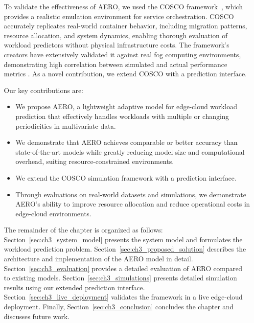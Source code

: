 To validate the effectiveness of \ac{AERO}, we used the \ac{COSCO} framework~\cite{tuli2021cosco}, which provides a realistic emulation environment for service orchestration. \ac{COSCO} accurately replicates real-world container behavior, including migration patterns, resource allocation, and system dynamics, enabling thorough evaluation of workload predictors without physical infrastructure costs. The framework's creators have extensively validated it against real fog computing environments, demonstrating high correlation between simulated and actual performance metrics \cite{tuli2021cosco}. As a novel contribution, we extend \ac{COSCO} with a prediction interface.

Our key contributions are:
\begin{itemize}
    \item We propose \ac{AERO}, a lightweight adaptive model for edge-cloud workload prediction that effectively handles workloads with multiple or changing periodicities in multivariate data.
    \item We demonstrate that \ac{AERO} achieves comparable or better accuracy than state-of-the-art models while greatly reducing model size and computational overhead, suiting resource-constrained environments.
    \item We extend the \ac{COSCO} simulation framework with a prediction interface.
    \item Through evaluations on real-world datasets and simulations, we demonstrate \ac{AERO}'s ability to improve resource allocation and reduce operational costs in edge-cloud environments.
\end{itemize}

The remainder of the chapter is organized as follows: Section~\ref{sec:ch3_system_model} presents the system model and formulates the workload prediction problem. Section~\ref{sec:ch3_proposed_solution} describes the architecture and implementation of the \ac{AERO} model in detail. Section~\ref{sec:ch3_evaluation} provides a detailed evaluation of \ac{AERO} compared to existing models. Section~\ref{sec:ch3_simulations} presents detailed simulation results using our extended prediction interface. Section~\ref{sec:ch3_live_deployment} validates the framework in a live edge-cloud deployment. Finally, Section~\ref{sec:ch3_conclusion} concludes the chapter and discusses future work.


